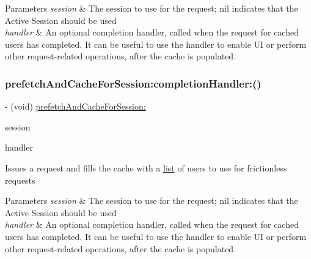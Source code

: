 \begin{DoxyParams}{Parameters}
{\em session} & The session to use for the request; nil indicates that the Active Session should be used\\
\hline
{\em handler} & An optional completion handler, called when the request for cached users has completed. It can be useful to use the handler to enable UI or perform other request-\/related operations, after the cache is populated. \\
\hline
\end{DoxyParams}
\mbox{\label{interfaceFBFrictionlessRecipientCache_a4c4c0f1fd519bfff5b39f3433fad29e3}} 
\subsubsection{\texorpdfstring{prefetch\+And\+Cache\+For\+Session\+:completion\+Handler\+:()}{prefetchAndCacheForSession:completionHandler:()}\hspace{0.1cm}{\footnotesize\ttfamily [3/5]}}
{\footnotesize\ttfamily -\/ (void) \hyperlink{interfaceFBFrictionlessRecipientCache_a4f218828f2b6a8bb5a8e0044e98689dc}{prefetch\+And\+Cache\+For\+Session\+:} \begin{DoxyParamCaption}\item[{(\hyperlink{interfaceFBSession}{F\+B\+Session} $\ast$)}]{session }\item[{completionHandler:(F\+B\+Request\+Handler)}]{handler }\end{DoxyParamCaption}}

Issues a request and fills the cache with a \hyperlink{protocollist-p}{list} of users to use for frictionless requests


\begin{DoxyParams}{Parameters}
{\em session} & The session to use for the request; nil indicates that the Active Session should be used\\
\hline
{\em handler} & An optional completion handler, called when the request for cached users has completed. It can be useful to use the handler to enable UI or perform other request-\/related operations, after the cache is populated. \\
\hline
\end{DoxyParams}
\mbox{\label{interfaceFBFrictionlessRecipientCache_a4c4c0f1fd519bfff5b39f3433fad29e3}} 
